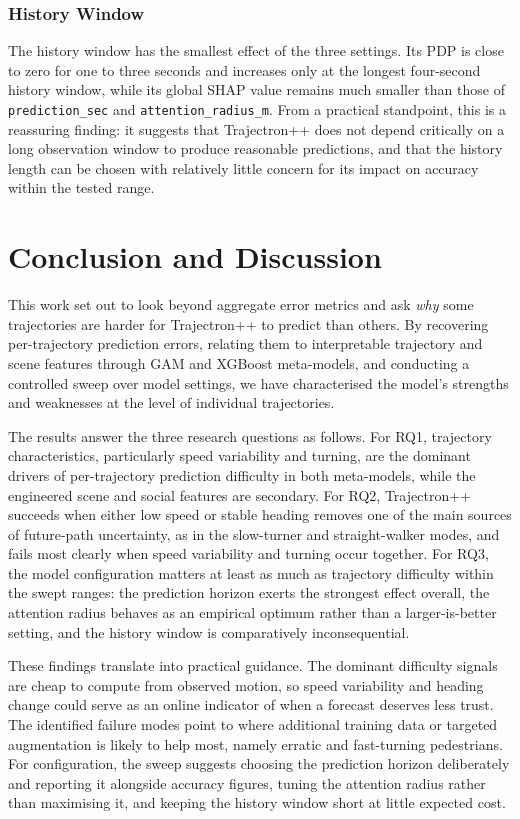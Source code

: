 \documentclass[12pt]{article}
\begin{document}
\subsubsection{History Window}

The history window has the smallest effect of the three settings. Its PDP is close to zero for one to three seconds and increases only at the longest four-second history window, while its global SHAP value remains much smaller than those of \texttt{prediction\_sec} and \texttt{attention\_radius\_m}. From a practical standpoint, this is a reassuring finding: it suggests that Trajectron++ does not depend critically on a long observation window to produce reasonable predictions, and that the history length can be chosen with relatively little concern for its impact on accuracy within the tested range.

\clearpage
\section{Conclusion and Discussion}
\label{sec:conclusion}

This work set out to look beyond aggregate error metrics and ask \emph{why} some trajectories are harder for Trajectron++ to predict than others. By recovering per-trajectory prediction errors, relating them to interpretable trajectory and scene features through GAM and XGBoost meta-models, and conducting a controlled sweep over model settings, we have characterised the model's strengths and weaknesses at the level of individual trajectories.

The results answer the three research questions as follows. For RQ1, trajectory characteristics, particularly speed variability and turning, are the dominant drivers of per-trajectory prediction difficulty in both meta-models, while the engineered scene and social features are secondary. For RQ2, Trajectron++ succeeds when either low speed or stable heading removes one of the main sources of future-path uncertainty, as in the slow-turner and straight-walker modes, and fails most clearly when speed variability and turning occur together. For RQ3, the model configuration matters at least as much as trajectory difficulty within the swept ranges: the prediction horizon exerts the strongest effect overall, the attention radius behaves as an empirical optimum rather than a larger-is-better setting, and the history window is comparatively inconsequential.

These findings translate into practical guidance. The dominant difficulty signals are cheap to compute from observed motion, so speed variability and heading change could serve as an online indicator of when a forecast deserves less trust. The identified failure modes point to where additional training data or targeted augmentation is likely to help most, namely erratic and fast-turning pedestrians. For configuration, the sweep suggests choosing the prediction horizon deliberately and reporting it alongside accuracy figures, tuning the attention radius rather than maximising it, and keeping the history window short at little expected cost.
\end{document}
